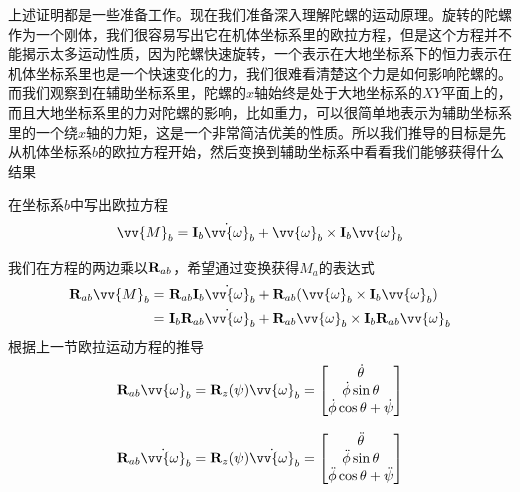 \documentclass[11pt]{article}
\begin{document}
上述证明都是一些准备工作。现在我们准备深入理解陀螺的运动原理。旋转的陀螺作为一个刚体，我们很容易写出它在机体坐标系里的欧拉方程，但是这个方程并不能揭示太多运动性质，因为陀螺快速旋转，一个表示在大地坐标系下的恒力表示在机体坐标系里也是一个快速变化的力，我们很难看清楚这个力是如何影响陀螺的。而我们观察到在辅助坐标系里，陀螺的$x$轴始终是处于大地坐标系的$XY$平面上的，而且大地坐标系里的力对陀螺的影响，比如重力，可以很简单地表示为辅助坐标系里的一个绕$x$轴的力矩，这是一个非常简洁优美的性质。所以我们推导的目标是先从机体坐标系$b$的欧拉方程开始，然后变换到辅助坐标系中看看我们能够获得什么结果
 
在坐标系$b$中写出欧拉方程
$$
\vv{M}_b = {\bf I}_b\dot{\vv{\omega}}_b + \vv{\omega}_b \times {\bf I}_b\vv{\omega}_b
$$

我们在方程的两边乘以${\bf R}_{ab}$，希望通过变换获得$M_a$的表达式
\begin{align*}
{\bf R}_{ab}\vv{M}_b = & \ {\bf R}_{ab}{\bf I}_b\dot{\vv{\omega}}_b + {\bf R}_{ab}(\vv{\omega}_b \times {\bf I}_b\vv{\omega}_b) \\
					 = & \ {\bf I}_b{\bf R}_{ab}\dot{\vv{\omega}}_b + {\bf R}_{ab}\vv{\omega}_b \times {\bf I}_b{\bf R}_{ab}\vv{\omega}_b \\
\end{align*}
根据上一节欧拉运动方程的推导
$$
{\bf R}_{ab}\vv{\omega}_b = {\bf R}_z(\psi)\vv{\omega}_b =\begin{bmatrix}\dot{\theta}	\\ \dot{\phi}\sin\theta	\\ \dot{\phi}\cos\theta +\dot{\psi}	\end{bmatrix} 
$$

$$
{\bf R}_{ab}\dot{\vv{\omega}}_b = {\bf R}_z(\psi)\dot{\vv{\omega}}_b = \begin{bmatrix}\ddot{\theta}	\\ \ddot{\phi}\sin\theta	\\ \ddot{\phi}\cos\theta +\ddot{\psi}	\end{bmatrix} 
$$

\end{document}

